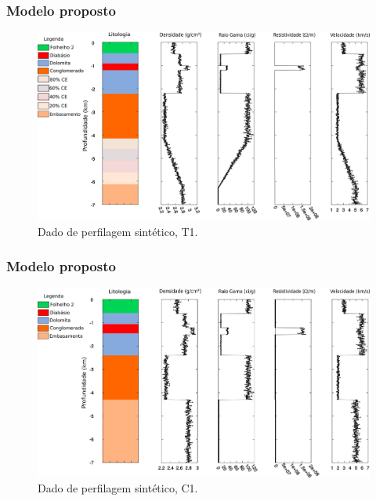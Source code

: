 \documentclass[10pt]{beamer} %
\begin{document}
\begin{frame}
	\frametitle{Modelo proposto}
	\begin{figure}[H]
		\centering
			\includegraphics[scale=0.37]{Imagens/PocoT1.png}
		\caption{Dado de perfilagem sintético, T1. }
		\label{T1}
	\end{figure}
\end{frame}


\begin{frame}
	\frametitle{Modelo proposto}
	\begin{figure}[H]
		\centering
			\includegraphics[scale=0.37]{Imagens/PocoC1.png}
		\caption{Dado de perfilagem sintético, C1.}
		\label{C1}
	\end{figure}
\end{frame}
\end{document}

